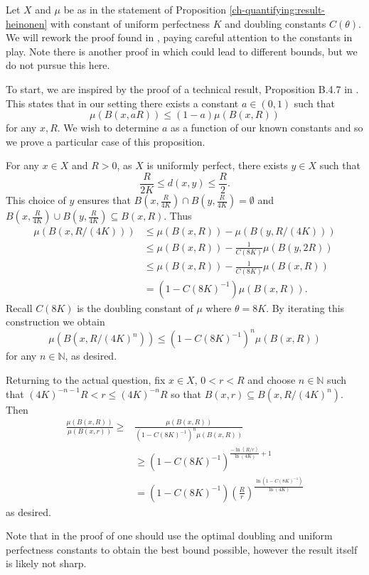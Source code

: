 Let $X$ and $\mu$ be as in the statement of Proposition \ref{ch-quantifying:result-heinonen} with constant of uniform perfectness $K$ and doubling constants $C(\theta)$. We will rework the proof found in \cite[lemma 3.1]{anti1}, paying careful attention to the constants in play. Note there is another proof in \cite[Lemma 4.5]{eino-pablo} which could lead to different bounds, but we do not pursue this here.
	
To start, we are inspired by the proof of a technical result, Proposition B.4.7 in \cite{gromov}. This states that in our setting there exists a constant $a \in (0,1)$ such that 
\[
\mu(B(x,aR)) \le (1-a) \mu(B(x,R))
\]
for any $x,R$. We wish to determine $a$ as a function of our known constants and so we prove a particular case of this proposition. 
	
For any $x\in X$ and $R>0$, as $X$ is uniformly perfect, there exists $y \in X$ such that $$\frac{R}{2K} \le d(x,y) \le \frac{R}{2}.$$ This choice of $y$ ensures that $B(x,\frac{R}{4K}) \cap B(y,\frac{R}{4K}) = \emptyset $ and $B(x,\frac{R}{4K}) \cup B(y,\frac{R}{4K}) \subseteq B(x,R)$. Thus
\begin{align*}
\mu(B(x,R/(4K))) &\le \mu(B(x,R)) - \mu(B(y, R/(4K)))\\
& \le \mu(B(x,R)) - \frac{1}{C(8K)}\mu(B(y,2R)) \\
& \le \mu(B(x,R)) - \frac{1}{C(8K)}\mu(B(x,R)) \\
& = (1-C(8K)^{-1}) \mu(B(x,R)).
\end{align*}
Recall $C(8K)$ is the doubling constant of $\mu$ where $\theta = 8K$. By iterating this construction we obtain
\[
\mu(B(x,R/(4K)^n)) \le (1-C(8K)^{-1})^n \mu(B(x,R))
\]
for any $n\in \mathbb{N}$, as desired.
	
Returning to the actual question, fix $x\in X$, $0 < r < R$ and choose $n\in \mathbb{N}$ such that $(4K)^{-n-1}R < r \le (4K)^{-n}R$ so that $B(x,r) \subseteq B(x,R/(4K)^{n})$. Then
\begin{align*}
\frac{\mu(B(x,R))}{\mu(B(x,r))} \ge& \frac{\mu(B(x,R))}{(1-C(8K)^{-1})^n\mu(B(x,R))} \\
& \ge (1-C(8K)^{-1})^{\frac{-\ln(R/r)}{\ln(4K)} + 1}\\
& = (1-C(8K)^{-1})\left(\frac{R}{r}\right)^{\frac{\ln(1-C(8K)^{-1})}{\ln(4K)}}
\end{align*}
as desired.
	
Note that in the proof of \cite{gromov} one should use the optimal doubling and uniform perfectness constants to obtain the best bound possible, however the result itself is likely not sharp.






